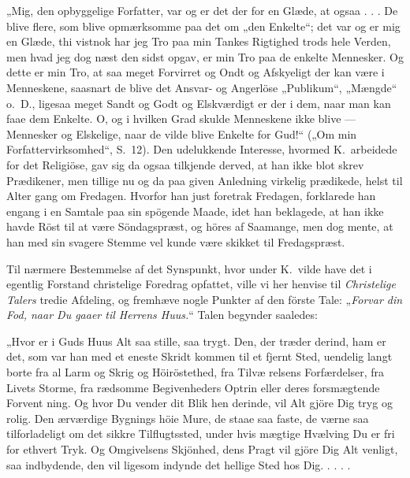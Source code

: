 \documentclass[12pt,a4paper]{article}
\newcommand{\opage}[1]{\marginnote{\footnotesize\textit{[#1]}}}
\begin{document}
„Mig, den opbyggelige Forfatter, var og er det der\-%
for en Glæde, at ogsaa . . . De blive flere, som blive
opmærksomme paa det om „den Enkelte“; det var og
er mig en Glæde, thi vistnok har jeg Tro paa min Tankes
Rigtighed trods hele Verden, men hvad jeg dog næst
den sidst opgav, er min Tro paa de enkelte Mennesker.
Og dette er min Tro, at saa meget Forvirret og Ondt
og Afskyeligt der kan være i Menneskene, saasnart de
blive det Ansvar- og Angerlöse „Publikum“, „Mængde“
o.\ D., ligesaa meget Sandt og Godt og Elskværdigt er
der i dem, naar man kan faae dem Enkelte. O, og i
hvilken Grad skulde Menneskene ikke blive --- Mennesker
og Elskelige, naar de vilde blive Enkelte for Gud!“
(„Om min Forfattervirksomhed“, S.\ 12).
\opage{12} %
Den udelukkende Interesse, hvormed K.\ arbeidede
for det Religiöse, gav sig da ogsaa tilkjende derved, at
han ikke blot skrev Prædikener, men tillige nu og da
paa given Anledning virkelig prædikede, helst til Alter\-%
gang om Fredagen. Hvorfor han just foretrak Fredagen,
forklarede han engang i en Samtale paa sin spögende
Maade, idet han beklagede, at han ikke havde Röst
til at være Söndagspræst, og höres af Saamange, men
dog mente, at han med sin svagere Stemme vel kunde
være skikket til Fredagspræst.

Til nærmere Bestemmelse af det Synspunkt, hvor\-%
under K.\ vilde have det i egentlig Forstand christelige
Foredrag opfattet, ville vi her henvise til \emph{Christelige
Talers} tredie Afdeling, og fremhæve nogle Punkter af
den förste Tale: „\emph{Forvar din Fod, naar Du gaaer
til Herrens Huus.}“ Talen begynder saaledes:

„Hvor er i Guds Huus Alt saa stille, saa trygt.
Den, der træder derind, ham er det, som var han med
et eneste Skridt kommen til et fjernt Sted, uendelig langt
borte fra al Larm og Skrig og Höiröstethed, fra Tilvæ\-%
relsens Forfærdelser, fra Livets Storme, fra rædsomme
Begivenheders Optrin eller deres forsmægtende Forvent\-%
ning. Og hvor Du vender dit Blik hen derinde, vil Alt
gjöre Dig tryg og rolig. Den ærværdige Bygnings höie
Mure, de staae saa faste, de værne saa tilforladeligt om
det sikkre Tilflugtssted, under hvis mægtige Hvælving Du
er fri for ethvert Tryk. Og Omgivelsens Skjönhed, dens
Pragt vil gjöre Dig Alt venligt, saa indbydende, den vil
ligesom indynde det hellige Sted hos Dig. . . . .
\end{document}
